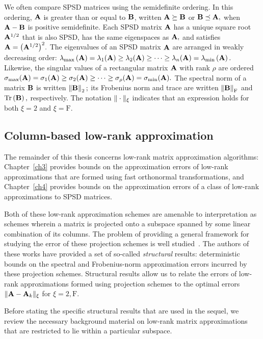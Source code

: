  We often compare SPSD matrices using the semidefinite ordering. 
 In this ordering, $\mathbf{A}$ is greater than or equal to $\mathbf{B}$, written 
 $\mathbf{A} \succeq \mathbf{B}$ or $\mathbf{B} \preceq \mathbf{A},$ when 
 $\mathbf{A} - \mathbf{B}$ is positive semidefinite. Each SPSD
 matrix $\mathbf{A}$ has a unique square root $\mathbf{A}^{1/2}$ that is also SPSD, 
 has the same eigenspaces as $\mathbf{A},$ and satisfies 
 $\mathbf{A} = \big(\mathbf{A}^{1/2}\big)^2.$ The eigenvalues of an SPSD matrix $\mathbf{A}$ are arranged in weakly decreasing order: 
 $\lambda_{\mathrm{max}}\left(\mathbf{A}\right) = \lambda_1(\mathbf{A}) \geq \lambda_2(\mathbf{A}) \geq \cdots \geq \lambda_n(\mathbf{A}) = \lambda_{\mathrm{min}}\left(\mathbf{A}\right).$ 
 Likewise, the singular values of a rectangular matrix $\mathbf{A}$ with rank $\rho$ are ordered 
 $\sigma_{\max}(\mathbf{A}) = \sigma_1(\mathbf{A}) \geq \sigma_2(\mathbf{A}) \geq \cdots \geq \sigma_\rho(\mathbf{A}) = \sigma_{\min}(\mathbf{A}).$ 
 The spectral norm of a matrix $\mathbf{B}$ is written
 $\left\|\mathbf{B}\right\|_2;$ its Frobenius norm and trace are written $\left\|\mathbf{B}\right\|_{\mathrm{F}}$ and $\operatorname{Tr}\left(\mathbf{B}\right),$ respectively. 
 The notation $\mbox{}\|\cdot\|_{\xi}$ indicates that an expression holds for both $\xi = 2$ and $\xi = \mathrm{F}$.
 
 
\subsection{ Column-based low-rank approximation}

The remainder of this thesis concerns low-rank matrix approximation 
algorithms: Chapter~\ref{ch3} provides bounds on the approximation errors 
of low-rank approximations that are formed using fast orthonormal
transformations, and Chapter~\ref{ch4} provides bounds on the approximation
errors of a class of low-rank approximations to SPSD matrices.

Both of these low-rank approximation schemes are amenable to interpretation
as schemes wherein a matrix is projected onto a subspace spanned by some 
linear combination of its columns. The problem of providing a general 
framework for studying the error of these projection schemes is well 
studied~\cite{BMD09a,HMT11,BDM11a}. The authors of these works have provided
a set of so-called \emph{structural} results: deterministic bounds on the
spectral and Frobenius-norm approximation errors incurred by these projection
schemes. Structural results allow
us to relate the errors of low-rank approximations formed using projection
schemes to the optimal errors $\mbox{}\|\mathbf{A} - \mathbf{A}_k\|_{\xi}$ for $\xi=2,\mathrm{F}.$

Before stating the specific structural results that are used in the sequel,
we review the necessary background material on low-rank matrix approximations 
that are restricted to lie within a particular subspace. 


